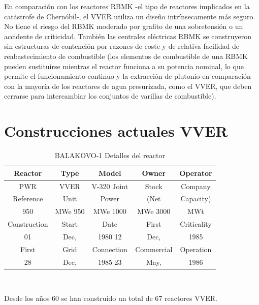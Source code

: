 \documentclass[]{article}
\begin{document}
En comparación con los reactores RBMK -el tipo de reactores implicados en la catástrofe de Chernóbil-, el VVER utiliza un diseño intrínsecamente más seguro. No tiene el riesgo del RBMK moderado por grafito de una sobretensión o un accidente de criticidad. También las centrales eléctricas RBMK se construyeron sin estructuras de contención por razones de coste y de relativa facilidad de reabastecimiento de combustible (los elementos de combustible de una RBMK pueden sustituirse mientras el reactor funciona a su potencia nominal, lo que permite el funcionamiento continuo y la extracción de plutonio en comparación con la mayoría de los reactores de agua presurizada, como el VVER, que deben cerrarse para intercambiar los conjuntos de varillas de combustible). 






\section{Construcciones actuales VVER}

\begin{table}[h!]
	\centering
	\begin{tabular}{||c|c|c|c|c||}
		\hline
		Reactor      & Type    & Model       & Owner      & Operator    \\ \hline\hline
		PWR          & VVER    & V-320	Joint & Stock      & Company     \\ \hline
		Reference    & Unit    & Power       & (Net       & Capacity)   \\ \hline
		950          & MWe	950 & MWe	1000    & MWe	3000   & MWt         \\ \hline
		Construction & Start   & Date        & First      & Criticality \\ \hline
		01           & Dec,    & 1980	12     & Dec,       & 1985        \\ \hline
		First        & Grid    & Connection  & Commercial & Operation   \\ \hline
		28           & Dec,    & 1985	23     & May,       & 1986        \\ \hline
	\end{tabular}
\caption{BALAKOVO-1 Detalles del reactor}
\
\end{table}

Desde los años 60 se han construido un total de 67 reactores VVER.\citep{Rosatom}\\
\end{document}
